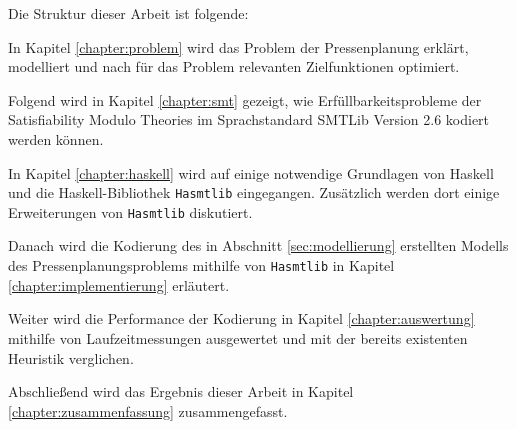 Die Struktur dieser Arbeit ist folgende:

In Kapitel \ref{chapter:problem} wird das Problem der Pressenplanung erklärt, modelliert und nach für das Problem relevanten Zielfunktionen optimiert.

Folgend wird in Kapitel \ref{chapter:smt} gezeigt, wie Erfüllbarkeitsprobleme der Satisfiability Modulo Theories im Sprachstandard SMTLib Version 2.6 kodiert werden können.

In Kapitel \ref{chapter:haskell} wird auf einige notwendige Grundlagen von Haskell und die Haskell-Bibliothek \texttt{Hasmtlib} eingegangen.
Zusätzlich werden dort einige Erweiterungen von \texttt{Hasmtlib} diskutiert.

Danach wird die Kodierung des in Abschnitt \ref{sec:modellierung} erstellten Modells des Pressenplanungsproblems mithilfe von \texttt{Hasmtlib}
in Kapitel \ref{chapter:implementierung} erläutert.

Weiter wird die Performance der Kodierung in Kapitel \ref{chapter:auswertung} mithilfe von Laufzeitmessungen ausgewertet und mit der bereits existenten Heuristik verglichen.

Abschließend wird das Ergebnis dieser Arbeit in Kapitel \ref{chapter:zusammenfassung} zusammengefasst.